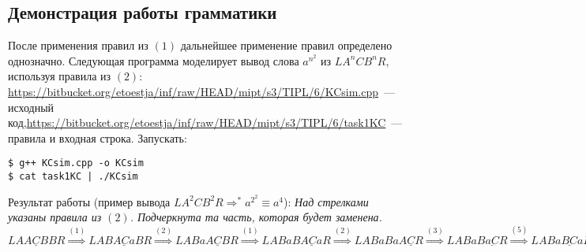 \documentclass[a4paper]{article}
\begin{document}
{\subsection*{Демонстрация работы грамматики}
После применения правил из $(1)$ дальнейшее применение правил определено однозначно. Следующая программа моделирует вывод слова $a^{n^2}$ из $LA^nCB^nR$, используя правила из $(2)$:\newline
\href{https://bitbucket.org/etoestja/inf/raw/HEAD/mipt/s3/TIPL/6/KCsim.cpp}{https://bitbucket.org/etoestja/inf/raw/HEAD/mipt/s3/TIPL/6/KCsim.cpp}~--- исходный код,\newline \href{https://bitbucket.org/etoestja/inf/raw/HEAD/mipt/s3/TIPL/6/task1KC}{https://bitbucket.org/etoestja/inf/raw/HEAD/mipt/s3/TIPL/6/task1KC}~--- правила и входная строка. Запускать:
\begin{verbatim}
$ g++ KCsim.cpp -o KCsim
$ cat task1KC | ./KCsim
\end{verbatim}
Результат работы (пример вывода $LA^2CB^2R\Longrightarrow^* a^{2^2}\equiv a^4$):\newline
{\em Над стрелками указаны правила из $(2)$. Подчеркнута та часть, которая будет заменена.}\newline
$LA\underline{ACB}BR \overset{(1)}{\Longrightarrow}LAB\underline{ACa}BR \overset{(2)}{\Longrightarrow}LABa\underline{ACB}R \overset{(1)}{\Longrightarrow}LABaB\underline{ACa}R \overset{(2)}{\Longrightarrow}LABaBa\underline{ACR} \overset{(3)}{\Longrightarrow}LABaB\underline{aC}R \overset{(5)}{\Longrightarrow}LABa\underline{BC}aR \overset{(4)}{\Longrightarrow}LAB\underline{aC}BaR \overset{(5)}{\Longrightarrow}LA\underline{BC}aBaR \overset{(4)}{\Longrightarrow}L\underline{ACB}aBaR \overset{(1)}{\Longrightarrow}LB\underline{ACa}aBaR \overset{(2)}{\Longrightarrow}LBa\underline{ACa}BaR \overset{(2)}{\Longrightarrow}LBaa\underline{ACB}aR \overset{(1)}{\Longrightarrow}LBaaB\underline{ACa}aR \overset{(2)}{\Longrightarrow}LBaaBa\underline{ACa}R \overset{(2)}{\Longrightarrow}LBaaBaa\underline{ACR} \overset{(3)}{\Longrightarrow}LBaaBa\underline{aC}R \overset{(5)}{\Longrightarrow}LBaaB\underline{aC}aR \overset{(5)}{\Longrightarrow}LBaa\underline{BC}aaR \overset{(4)}{\Longrightarrow}LBa\underline{aC}BaaR \overset{(5)}{\Longrightarrow}LB\underline{aC}aBaaR \overset{(5)}{\Longrightarrow}L\underline{BC}aaBaaR \overset{(4)}{\Longrightarrow}\underline{LCB}aaBaaR \overset{(8)}{\Longrightarrow}\underline{LCa}aBaaR \overset{(7)}{\Longrightarrow}a\underline{LCa}BaaR \overset{(7)}{\Longrightarrow}aa\underline{LCB}aaR \overset{(8)}{\Longrightarrow}aa\underline{LCa}aR \overset{(7)}{\Longrightarrow}aaa\underline{LCa}R \overset{(7)}{\Longrightarrow}aaaa\underline{LCR} \overset{(9)}{\Longrightarrow}aaaa$
}
\end{document}

